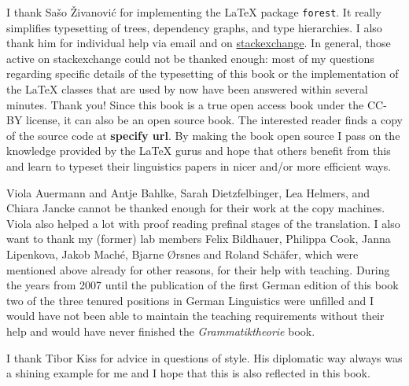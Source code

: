I thank Sašo Živanović for implementing the \LaTeX{} package \texttt{forest}. It really simplifies
typesetting of trees, dependency graphs, and type hierarchies. I also thank him for individual help
via email and on \href{http://www.stackexchange.com}{stackexchange}. In general, those active on stackexchange could not be thanked
enough: most of my questions regarding specific details of the typesetting of this book or the
implementation of the \LaTeX{} classes that are used by \lsp now have been answered within several
minutes. Thank you! Since this book is a true open access book under the CC-BY license, it can also
be an open source book. The interested reader finds a copy of the source code at \textbf{specify
  url}. By making the book open source I pass on the knowledge provided by the \LaTeX{} gurus and
hope that others benefit from this and learn to typeset their linguistics papers in nicer and/or
more efficient ways.


Viola Auermann and Antje Bahlke, Sarah Dietzfelbinger, Lea Helmers, and Chiara Jancke cannot be thanked enough for their work at the copy machines. Viola
also helped a lot with proof reading prefinal stages of the translation.
I also want to thank my (former) lab members Felix Bildhauer, Philippa Cook, Janna Lipenkova, Jakob Maché,
Bjarne Ørsnes and Roland Schäfer, which were mentioned above already
for other reasons, for their help with teaching. During the years from 2007 until the publication of
the first German edition of this book two of the three tenured positions in German Linguistics were
unfilled and I would have not been able to maintain the teaching requirements without their help and
would have never finished the \emph{Grammatiktheorie} book.

I thank Tibor Kiss for advice in questions of style. His diplomatic way always was a shining
example for me and I hope that this is also reflected in this book.

